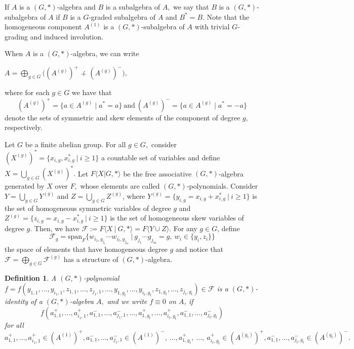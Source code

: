 \documentclass{amsart}
\newcommand{\Gstar}{\ensuremath{(G,\ast)}-}
\newtheorem{definicao}[teorema]{Definition}
\numberwithin{equation}{section}
\begin{document}
 If $A$ is a $(G,*)$-algebra and $B$ is a subalgebra of $A,$ we say that $B$ is a $(G,*)$-subalgebra of $A$ if $B$ is a $G$-graded subalgebra of $A$ and $B^*=B.$
 Note that the homogeneous component $A^{(1)}$ is a $(G,*)$-subalgebra of $A$ with trivial $G$-grading and induced involution. 

When $A$ is a $(G, *)$-algebra, we can write

\begin{center}
	$A=\bigoplus\limits_{g\in G}\big((A^{(g)})^+$ \.+ $(A^{(g)})^-\big),$
\end{center}
where for each $g \in G$ we have that   
$$(A^{(g)})^+=\{a \in A^{(g)}\mid a^*=a\} ~\mbox{and} ~(A^{(g)})^-=\{a \in A^{(g)}\mid a^*=-a\}$$ 
denote the sets of symmetric and skew elements of the component of degree $g,$  respectively.
 


Let $G$ be a finite abelian group. For all $g \in G,$ consider $(X^{(g)})^* = \{x_{i,g}, x^*_{i,g} ~| ~ i \ge 1\}$ a countable set of variables and define $X =\bigcup\limits_{g\in G}(X^{(g)})^*.$
Let $F \langle X| G, * \rangle$ be the free associative \Gstar algebra generated by $X$ over $F,$ whose elements are called $(G,*)$-polynomials. Consider $Y=\underset{g\in G}{\bigcup }Y^{(g) }$ and $Z=\underset{g\in G}{\bigcup }Z^{(g) }$, where $Y^{(g)} = \{y_{i,g}=x_{i,g}+x^*_{i,g} ~| ~ i \ge 1\}$ is the set of
homogeneous symmetric variables of degree $g$ and $Z^{(g)} = \{z_{i,g}=x_{i,g}-x^*_{i,g} ~|~ i \ge 1\}$ is the set of
homogeneous skew variables of degree $g.$ 
Then, we have $\mathcal{F} := F\langle X ~|~ G, *\rangle = F\langle Y \cup Z\rangle.$ 
For any $g\in G$, define
$$\mathcal{F}_g = \mbox{span}_F \{w_{i_1,g_{j_1}}
\cdots w_{i_t,g_{j_m}}
~|~ g_{j_1}\cdots g_{j_m} = g,~ w_i \in \{y_i, z_i\}\}$$
the space of elements that have homogeneous
degree $g$ and notice that $\mathcal{F} =\bigoplus\limits_{g\in G}\mathcal{F}^{(g)}$ has a structure of $(G, *)$-algebra.

\begin{definicao} A $(G,*)$-polynomial $f=f(y_{1,1},\ldots,y_{i_1,1}, z_{1,1},\ldots,z_{j_1,1}, \ldots, y_{1,g_t},\ldots,y_{i_t,g_t}, z_{1,g_t},\ldots,z_{j_t,g_t}) \in \mathcal{F}$ is a $(G,*)$-identity of a $(G,*)$-algebra $A,$ and we write $f \equiv 0$ on $A$, if $$f(a^+_{1,1},\ldots,a^+_{i_1,1}, a^-_{1,1},\ldots,a^-_{j_1,1}, \ldots, a^+_{1,g_t},\ldots,a^+_{i_t,g_t}, a^-_{1,1},\ldots,a^-_{j_t,g_t})$$ for all $a^+_{1,1},\ldots,a^+_{i_1,1} \in (A^{(1)})^+, a^-_{1,1},\ldots,a^-_{j_1,1} \in (A^{(1)})^-, ~\ldots, a^+_{1,g_t},~\ldots,~a^+_{i_t,g_t} \in (A^{(g_t)})^+ , a^-_{1,1},\ldots,a^-_{j_t,g_t} \in (A^{(g_t)})^-.$ 

\end{definicao}
\end{document}
